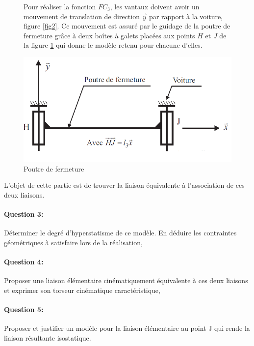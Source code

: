\begin{figure}[!h]
\begin{minipage}{0.6\linewidth}
Pour réaliser la fonction $FC_3$, les vantaux doivent avoir un mouvement de translation de direction $\overrightarrow{y}$ par rapport à la voiture, figure \ref{fig2}. Ce mouvement est assuré par le guidage de la
poutre de fermeture grâce à deux boîtes à galets placées aux points $H$ et $J$ de la figure \ref{fig10} qui donne le modèle retenu pour chacune d'elles.
\end{minipage}
\hfill
\begin{minipage}{0.35\linewidth}
 \centering\includegraphics[width=\linewidth]{img/Portes11.png}
 \caption{Poutre de fermeture}
 \label{fig10}
 \end{minipage}
\end{figure}

L'objet de cette partie est de trouver la liaison équivalente à l'association de ces deux liaisons.

\paragraph{Question 3:} Déterminer le degré d'hyperstatisme de ce modèle. En déduire les contraintes géométriques à satisfaire lors de la réalisation,

\paragraph{Question 4:} Proposer une liaison élémentaire cinématiquement équivalente à ces deux liaisons et exprimer son torseur cinématique caractéristique,

\paragraph{Question 5:} Proposer et justifier un modèle pour la liaison élémentaire au point J qui rende la liaison résultante isostatique.

